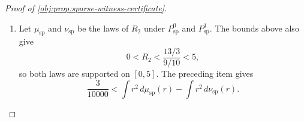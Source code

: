 \begin{proof}[Proof of \cref{obj:prop:sparse-witness-certificate}]
\begin{enumerate}
For \(\tau\in[-1/10,1/10]\), set
\[
\Omega_\tau(y)
=
\frac{\mathfrak q(y)^2}{(1+\tau h(y))^2}.
\]
The elementary exponential bounds
\[
13<\exp(4)<55
\]
imply
\[
\frac{2}{27}<\frac4{\exp(4)-1},\qquad
\Omega_\tau(y)>\frac4{729}\frac{100}{121}.
\]
Moreover
\[
\frac{d}{dy}\log\Omega_\tau(y)
=
8-\frac{4\tau}{1+\tau h(y)}
\ge \frac{68}{9},
\]
so
\[
\frac{68}{9}\frac4{729}\frac{100}{121}
\le \Omega_\tau'(y).
\]
Integrating this derivative bound from \(1/2\) to \(y\), with the direction reversed when \(y<1/2\), gives
\[
\frac{68}{9}\frac4{729}\frac{100}{121}
\cdot 2\Bigl(y-\frac12\Bigr)^2
\le
h(y)\{\Omega_\tau(y)-\Omega_\tau(1/2)\}.
\]
After integration over \(y\in[0,1]\), using \(\int_0^1 h(y)\,dy=0\) and
\[
\int_0^1 2\Bigl(y-\frac12\Bigr)^2\,dy=\frac16,
\]
we obtain
\[
\frac16\frac{68}{9}\frac4{729}\frac{100}{121}
\le
\int_0^1 h(y)\Omega_\tau(y)\,dy.
\]
Since
\[
A_{\mathrm{sp}}'(x)
=
-\frac15\int_0^1 h(y)\Omega_{h(x)/10}(y)\,dy,
\]
and \(H'(x)=\mathfrak q(x)-1\) with \(H(0)=H(1)=0\), integration by parts yields
\[
\int_0^1 \{1-\mathfrak q(x)\}A_{\mathrm{sp}}(x)\,dx
=
\int_0^1 H(x)A_{\mathrm{sp}}'(x)\,dx
\ge
\frac1{30}\frac{68}{9}\frac4{729}\frac{100}{121}
\int_0^1\{-H(x)\}\,dx .
\]
The last integral is
\[
\int_0^1\{-H(x)\}\,dx
=
\frac1{1-\exp(-4)}-\frac34
>
\frac{29}{108}.
\]
Therefore
\[
\int R_2^2\,dP^0_{\mathrm{sp}}
-
\int R_2^2\,dP^1_{\mathrm{sp}}
>
\frac1{30}\frac{68}{9}\frac4{729}\frac{100}{121}\frac{29}{108}
=
\frac{19720}{64304361}
>
\frac3{10000}.
\]

\item Let \(\mu_{\mathrm{sp}}\) and \(\nu_{\mathrm{sp}}\) be the laws of \(R_2\) under \(P^0_{\mathrm{sp}}\) and \(P^1_{\mathrm{sp}}\).  The bounds above also give
\[
0<R_2<\frac{13/3}{9/10}<5,
\]
so both laws are supported on \([0,5]\).  The preceding item gives
\[
\frac3{10000}
<
\int r^2\,d\mu_{\mathrm{sp}}(r)-\int r^2\,d\nu_{\mathrm{sp}}(r).
\]


\end{enumerate}
\end{proof}
